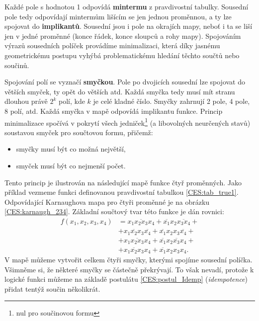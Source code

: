{     Každé pole s hodnotou 1 odpovídá \textbf{mintermu} z pravdivostní tabulky. Sousední pole tedy 
     odpovídají mintermům lišícím se jen jednou proměnnou, a ty lze spojovat do 
     \textbf{implikantů}. Sousední jsou i pole na okrajích mapy, neboť i ta se liší
     jen v jedné proměnné (konce řádek, konce sloupců a rohy mapy). Spojováním výrazů sousedních 
     políček provádíme minimalizaci, která díky jasnému geometrickému postupu vyhýbá 
     problematickému hledání těchto součtů nebo součinů. 
     
     Spojování polí se vyznačí \textbf{smyčkou}. Pole po dvojicích sousední lze spojovat do větších 
     smyček, ty opět do větších atd. Každá smyčka tedy musí mít stranu dlouhou právě $2^k$ polí, 
     kde $k$  je celé kladné číslo. Smyčky zahrnují 2 pole, 4 pole, 8 polí, atd. Každá smyčka v 
     mapě odpovídá implikantu funkce. Princip minimalizace spočívá v pokrytí všech     
     jedniček\footnote{nul pro součinovou formu} (a libovolných neurčených stavů) soustavou smyček 
     pro součtovou formu, přičemž:
     \begin{itemize}\addtolength{\itemsep}{-0.5\baselineskip}
       \item smyčky musí být co možná největší,
       \item smyček musí být co nejmenší počet.       
     \end{itemize}     
     Tento princip je ilustrován na následující mapě funkce čtyř proměnných. Jako příklad vezmeme 
     funkci definovanou pravdivostní tabulkou \ref{CES:tab_true1}. Odpovídající Karnaughova mapa 
     pro čtyři proměnné je na obrázku \ref{CES:karnaugh_234}. Základní součtový tvar této funkce je 
     dán rovnici:     
     \begin{align}
        f(x_1, x_2, x_3, x_4) 
          &= \overline{x_1x_2x_3x_4} + \overline{x_1}x_2\overline{x_3x_4} +           \nonumber \\
          &+ x_1\overline{x_2}x_3\overline{x_4} + \overline{x_1}x_2x_3\overline{x_4}+ \nonumber \\ 
          &+ x_1\overline{x_2x_3}x_4 + \overline{x_1}x_2\overline{x_3}x_4 +           \nonumber \\ 
          &+ x_1\overline{x_2}x_3x_4 + \overline{x_1}x_2x_3x_4.                          
     \end{align}
     V mapě můžeme vytvořit celkem čtyři smyčky, kterými spojíme sousední políčka. Všimněme si, že 
     některé smyčky se částečně překrývají. To však nevadí, protože k logické funkci můžeme na 
     základě postulátu \ref{CES:postul_Idemp} (\emph{idempotence})
     přidat tentýž součin několikrát. 
     
}
